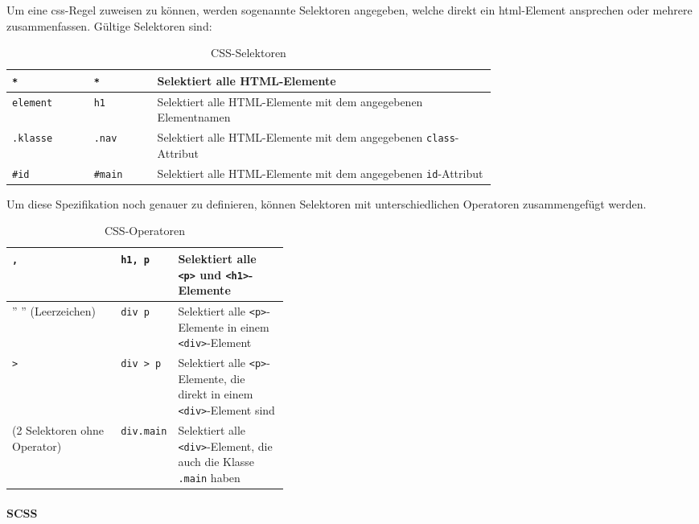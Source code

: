 Um eine \gls{css}-Regel zuweisen zu können, werden sogenannte Selektoren angegeben, welche direkt ein \gls{html}-Element ansprechen oder mehrere zusammenfassen. Gültige Selektoren sind:

\begin{table}[H]
    \centering
    \begin{tabular}{|l|l|p{0.7\linewidth}|}
        \hline
        \lstinline|*| & \lstinline|*| & Selektiert alle HTML-Elemente                                                      \\ \hline
        \lstinline|element| & \lstinline|h1| & Selektiert alle HTML-Elemente mit dem angegebenen Elementnamen                     \\ \hline
        \lstinline|.klasse| & \lstinline|.nav| & Selektiert alle HTML-Elemente mit dem angegebenen \lstinline|class|-Attribut \\ \hline
        \lstinline|#id| & \lstinline|#main| & Selektiert alle HTML-Elemente mit dem angegebenen \lstinline|id|-Attribut \\ \hline
    \end{tabular}
    \caption{CSS-Selektoren}
\end{table}

Um diese Spezifikation noch genauer zu definieren, können Selektoren mit unterschiedlichen Operatoren zusammengefügt werden.

\begin{table}[H]
    \centering
    \begin{tabular}{|l|l|p{0.4\linewidth}|}
        \hline
        \lstinline|,|      & \lstinline|h1, p| & Selektiert alle \lstinline|<p>| und \lstinline|<h1>|-Elemente                                \\ \hline
        '' '' (Leerzeichen)          & \lstinline|div p| & Selektiert alle \lstinline|<p>|-Elemente in einem \lstinline|<div>|-Element                  \\ \hline
        \lstinline|>|      & \lstinline|div > p| & Selektiert alle \lstinline|<p>|-Elemente, die direkt in einem \lstinline|<div>|-Element sind \\ \hline
        (2 Selektoren ohne Operator) & \lstinline|div.main| & Selektiert alle \lstinline|<div>|-Element, die auch die Klasse \lstinline|.main| haben          \\ \hline
    \end{tabular}
    \caption{CSS-Operatoren}
\end{table}

\paragraph{SCSS}

